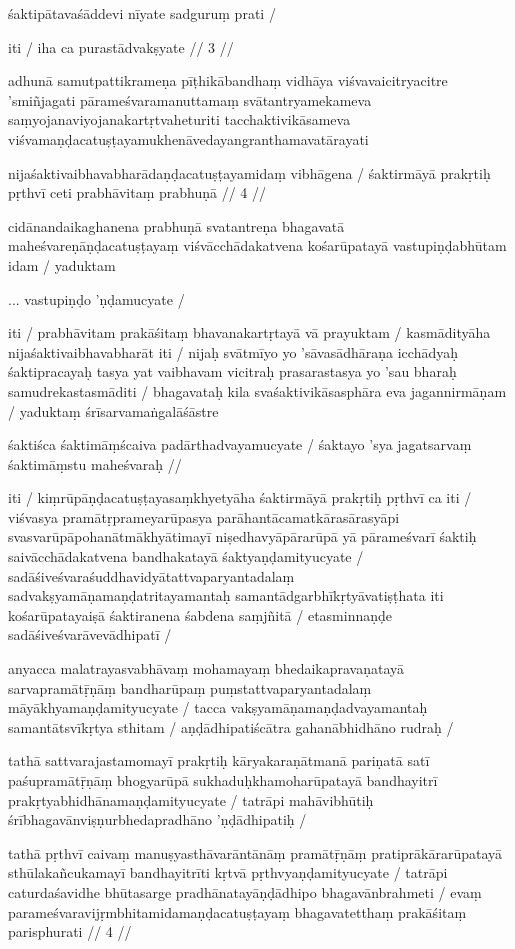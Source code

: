 śaktipātavaśāddevi nīyate sadguruṃ prati  /

iti  / iha ca purastādvakṣyate  // 3  //

adhunā samutpattikrameṇa pīṭhikābandhaṃ vidhāya viśvavaicitryacitre 'smiñjagati pārameśvaramanuttamaṃ svātantryamekameva saṃyojanaviyojanakartṛtvaheturiti tacchaktivikāsameva viśvamaṇḍacatuṣṭayamukhenāvedayangranthamavatārayati

nijaśaktivaibhavabharādaṇḍacatuṣṭayamidaṃ vibhāgena  /
śaktirmāyā prakṛtiḥ pṛthvī ceti prabhāvitaṃ prabhuṇā  // 4  //

cidānandaikaghanena prabhuṇā svatantreṇa bhagavatā maheśvareṇāṇḍacatuṣṭayaṃ viśvācchādakatvena kośarūpatayā vastupiṇḍabhūtam idam  / yaduktam

... vastupiṇḍo 'ṇḍamucyate  /

iti  / prabhāvitam prakāśitaṃ bhavanakartṛtayā vā prayuktam  / kasmādityāha nijaśaktivaibhavabharāt iti  / nijaḥ svātmīyo yo 'sāvasādhāraṇa icchādyaḥ śaktipracayaḥ tasya yat vaibhavam vicitraḥ prasarastasya yo 'sau bharaḥ samudrekastasmāditi  / bhagavataḥ kila svaśaktivikāsasphāra eva jagannirmāṇam  / yaduktaṃ śrīsarvamaṅgalāśāstre

śaktiśca śaktimāṃścaiva padārthadvayamucyate  /
śaktayo 'sya jagatsarvaṃ śaktimāṃstu maheśvaraḥ  //

iti  / kiṃrūpāṇḍacatuṣṭayasaṃkhyetyāha śaktirmāyā prakṛtiḥ pṛthvī ca iti  / viśvasya pramātṛprameyarūpasya parāhantācamatkārasārasyāpi svasvarūpāpohanātmākhyātimayī niṣedhavyāpārarūpā yā pārameśvarī śaktiḥ saivācchādakatvena bandhakatayā śaktyaṇḍamityucyate  / sadāśiveśvaraśuddhavidyātattvaparyantadalaṃ sadvakṣyamāṇamaṇḍatritayamantaḥ samantādgarbhīkṛtyāvatiṣṭhata iti kośarūpatayaiṣā śaktiranena śabdena saṃjñitā  / etasminnaṇḍe sadāśiveśvarāvevādhipatī  /

anyacca malatrayasvabhāvaṃ mohamayaṃ bhedaikapravaṇatayā sarvapramātṝṇāṃ bandharūpaṃ puṃstattvaparyantadalaṃ māyākhyamaṇḍamityucyate  / tacca vakṣyamāṇamaṇḍadvayamantaḥ samantātsvīkṛtya sthitam  / aṇḍādhipatiścātra gahanābhidhāno rudraḥ  /

tathā sattvarajastamomayī prakṛtiḥ kāryakaraṇātmanā pariṇatā satī paśupramātṝṇāṃ bhogyarūpā sukhaduḥkhamoharūpatayā bandhayitrī prakṛtyabhidhānamaṇḍamityucyate  / tatrāpi mahāvibhūtiḥ śrībhagavānviṣṇurbhedapradhāno 'ṇḍādhipatiḥ  /

tathā pṛthvī caivaṃ manuṣyasthāvarāntānāṃ pramātṝṇāṃ pratiprākārarūpatayā sthūlakañcukamayī bandhayitrīti kṛtvā pṛthvyaṇḍamityucyate  / tatrāpi caturdaśavidhe bhūtasarge pradhānatayāṇḍādhipo bhagavānbrahmeti  / evaṃ parameśvaravijṛmbhitamidamaṇḍacatuṣṭayaṃ bhagavatetthaṃ prakāśitaṃ parisphurati  // 4  //

